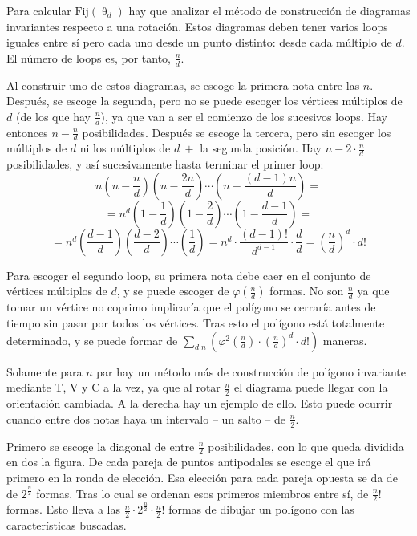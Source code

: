 		Para calcular $\text{Fij}(\uptheta_d)$ hay que analizar el método de construcción de diagramas invariantes respecto a una rotación. Estos diagramas deben tener varios loops iguales entre sí pero cada uno desde un punto distinto: desde cada múltiplo de $d$. El número de loops es, por tanto, $\frac{n}{d}$.
		
		Al construir uno de estos diagramas, se escoge la primera nota entre las $n$. Después, se escoge la segunda, pero no se puede escoger los vértices múltiplos de $d$ (de los que hay $\frac{n}{d}$), ya que van a ser el comienzo de los sucesivos loops. Hay entonces $n-\frac{n}{d}$ posibilidades. Después se escoge la tercera, pero sin escoger los múltiplos de $d$ ni los múltiplos de $d\ +$ la segunda posición. Hay $n - 2\cdot\frac{n}{d}$ posibilidades, y así sucesivamente hasta terminar el primer loop:
		$$n\left(n-\frac{n}{d}\right)\left(n-\frac{2n}{d}\right)\cdots\left(n-\frac{(d-1)n}{d}\right)=$$ 
		$$=n^d\left(1-\frac{1}{d}\right)\left(1-\frac{2}{d}\right)\cdots\left(1-\frac{d-1}{d}\right)=$$
		$$=n^d\left(\frac{d-1}{d}\right)\left(\frac{d-2}{d}\right)\cdots\left(\frac{1}{d}\right)=n^d\cdot\frac{(d-1)!}{d^{d-1}}\cdot\frac{d}{d}=\left(\frac{n}{d}\right)^d\cdot d!$$
		
		Para escoger el segundo loop, su primera nota debe caer en el conjunto de vértices múltiplos de $d$, y se puede escoger de $\varphi\left(\frac{n}{d}\right)$ formas. No son $\frac{n}{d}$ ya que tomar un vértice no coprimo implicaría que el polígono se cerraría antes de tiempo sin pasar por todos los vértices. Tras esto el polígono está totalmente determinado, y se puede formar de $\sum_{d|n}\left(\varphi^2(\frac{n}{d})\cdot\left(\frac{n}{d}\right)^d\cdot d!\right)$ maneras.
		
		Solamente para $n$ par hay un método más de construcción de polígono invariante mediante T, V y C a la vez, ya que al rotar $\frac{n}{2}$ el diagrama puede llegar con la orientación cambiada. A la derecha hay un ejemplo de ello. Esto puede ocurrir cuando entre dos notas haya un intervalo -- un salto -- de $\frac{n}{2}$.
		
		Primero se escoge la diagonal de entre $\frac{n}{2}$ posibilidades, con lo que queda dividida en dos la figura. De cada pareja de puntos antipodales se escoge el que irá primero en la ronda de elección. Esa elección para cada pareja opuesta se da de de $2^{\frac{n}{2}}$ formas. Tras lo cual se ordenan esos primeros miembros entre sí, de $\frac{n}{2}!$ formas. Esto lleva a las $\frac{n}{2}\cdot2^{\frac{n}{2}}\cdot\frac{n}{2}!$ formas de dibujar un polígono con las características buscadas.		
		
